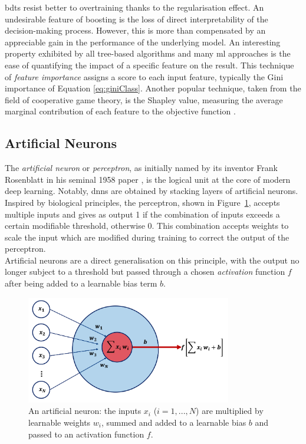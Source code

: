 \glspl{bdt} resist better to overtraining thanks to the regularisation effect. An undesirable feature of boosting is the loss of direct interpretability of the decision-making process. However, this is more than compensated by an appreciable gain in the performance of the underlying model. An interesting property exhibited by all tree-based algorithms and many \gls{ml} approaches is the ease of quantifying the impact of a specific feature on the result. This technique of \textit{feature importance} assigns a score to each input feature, typically the Gini importance of Equation \ref{eq:giniClass}. Another popular technique, taken from the field of cooperative game theory, is the Shapley value, measuring the average marginal contribution of each feature to the objective function \cite{shapley:book1952, Rozemberczki2022TheSV}.


\subsection{Artificial Neurons}
The \textit{artificial neuron} or \textit{perceptron}, as initially named by its inventor Frank Rosenblatt in his seminal 1958 paper \cite{rosenblatt1958perceptron}, is the logical unit at the core of modern deep learning. Notably, \glspl{dnn} are obtained by stacking layers of artificial neurons. Inspired by biological principles, the perceptron, shown in Figure~\ref{fig:annModel}, accepts multiple inputs and gives as output 1 if the combination of inputs exceeds a certain modifiable threshold, otherwise 0. This combination accepts weights to scale the input which are modified during training to correct the output of the perceptron. \\
\newpage
Artificial neurons are a direct generalisation on this principle, with the output no longer subject to a threshold but passed through a chosen \textit{activation} function $f$ after being added to a learnable bias term $b$. 

\begin{figure}[h!]
    \center
    \includegraphics[width=0.8\textwidth]{Images/ML/ann.png}
    \caption{An artificial neuron: the inputs $x_i$ ($i= 1, ..., N$) are multiplied by learnable weights $w_i$, summed and added to a learnable bias $b$ and passed to an activation function $f$.} 
    \label{fig:annModel}
\end{figure}

